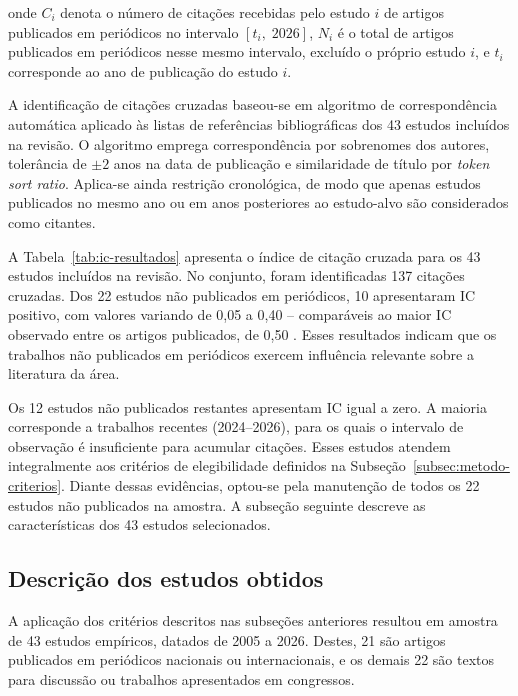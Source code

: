 \noindent onde $C_i$ denota o número de citações recebidas pelo estudo $i$ de artigos publicados em periódicos no intervalo $[t_i,\; 2026]$, $N_i$ é o total de artigos publicados em periódicos nesse mesmo intervalo, excluído o próprio estudo $i$, e $t_i$ corresponde ao ano de publicação do estudo $i$.



A identificação de citações cruzadas baseou-se em algoritmo de correspondência automática aplicado às listas de referências bibliográficas dos 43 estudos incluídos na revisão. O algoritmo emprega correspondência por sobrenomes dos autores, tolerância de $\pm 2$ anos na data de publicação e similaridade de título por \textit{token sort ratio}. Aplica-se ainda restrição cronológica, de modo que apenas estudos publicados no mesmo ano ou em anos posteriores ao estudo-alvo são considerados como citantes.

A Tabela~\ref{tab:ic-resultados} apresenta o índice de citação cruzada para os 43 estudos incluídos na revisão. No conjunto, foram identificadas 137 citações cruzadas. Dos 22 estudos não publicados em periódicos, 10 apresentaram IC positivo, com valores variando de 0,05 a 0,40 -- comparáveis ao maior IC observado entre os artigos publicados, de 0,50 \cite{SilvaResende2009}. Esses resultados indicam que os trabalhos não publicados em periódicos exercem influência relevante sobre a literatura da área.

Os 12 estudos não publicados restantes apresentam IC igual a zero. A maioria corresponde a trabalhos recentes (2024--2026), para os quais o intervalo de observação é insuficiente para acumular citações. Esses estudos atendem integralmente aos critérios de elegibilidade definidos na Subseção~\ref{subsec:metodo-criterios}. Diante dessas evidências, optou-se pela manutenção de todos os 22 estudos não publicados na amostra. A subseção seguinte descreve as características dos 43 estudos selecionados.

\subsection{Descrição dos estudos obtidos}
\label{subsec:metodo-descricao-estudos}

A aplicação dos critérios descritos nas subseções anteriores resultou em amostra de 43 estudos empíricos, datados de 2005 a 2026. Destes, 21 são artigos publicados em periódicos nacionais ou internacionais, e os demais 22 são textos para discussão ou trabalhos apresentados em congressos.


